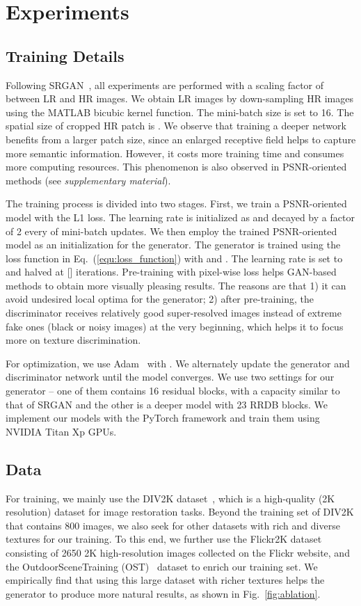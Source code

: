 \documentclass[runningheads]{llncs}
\begin{document}
\section{Experiments} \label{sec:exp}
\subsection{Training Details}

Following SRGAN~\cite{ledig2017photo}, all experiments are performed with a scaling factor of  between LR and 
HR images.
We obtain LR images by down-sampling HR images using the MATLAB bicubic kernel function. The mini-batch size is set to 
16. The spatial size of cropped HR patch is .
We observe that training a deeper network benefits from a larger patch size, since an enlarged receptive field helps to 
capture more semantic information. However, it costs more training time and consumes more computing resources. 
This phenomenon is also observed in PSNR-oriented methods (see \textit{supplementary material}).


The training process is divided into two stages. 
First, we train a PSNR-oriented model with the L1 loss. 
The learning rate is initialized as  and decayed by a factor of 2 every  of mini-batch 
updates. 
We then employ the trained PSNR-oriented model as an initialization for the generator.
The generator is trained using the loss function in Eq.~(\ref{equ:loss_function}) with  
and . 
The learning rate is set to  and halved at [] iterations.
Pre-training with pixel-wise loss helps GAN-based methods to obtain more visually pleasing results.
The reasons are that 1) it can avoid undesired local optima for the generator; 
2) after pre-training, the discriminator receives relatively good super-resolved images instead of extreme fake ones 
(black or noisy images) at the very beginning, which helps it to focus more on texture discrimination.


For optimization, we use Adam~\cite{kingma2014adam} with . 
We alternately update the generator and discriminator network until the model converges.
We use two settings for our generator -- one of them contains 16 residual blocks, with a capacity similar to that of 
SRGAN and the
other is a deeper model with 23 RRDB blocks.
We implement our models with the PyTorch framework and train them using NVIDIA Titan Xp GPUs.


\subsection{Data}
For training, we mainly use the DIV2K dataset~\cite{agustsson2017ntire}, which is a high-quality (2K resolution) 
dataset 
for image restoration tasks. 
Beyond the training set of DIV2K that contains 800 images, we also seek for other datasets with rich and diverse 
textures for our training.
To this end, we further use the Flickr2K dataset~\cite{timofte2017ntire} consisting of 
2650 2K high-resolution images collected on the Flickr website, and the OutdoorSceneTraining 
(OST)~\cite{wang2018sftgan} 
dataset to enrich our training set. 
We empirically find that using this large dataset with richer textures helps the generator to produce more natural 
results, as shown in Fig.~\ref{fig:ablation}.
\end{document}
